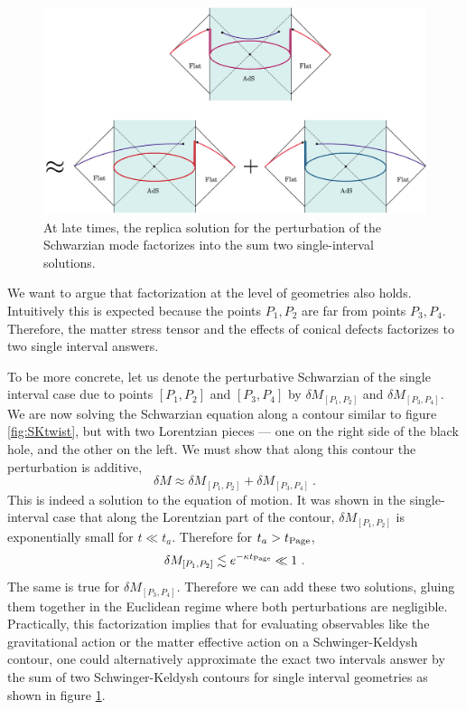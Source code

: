 \documentclass[11pt,oneside,letterpaper]{article}
\newcommand{\be}{\begin{equation}}
\newcommand{\ee}{\end{equation}}
\def\be{\begin{eqnarray}}
\def\ee{\end{eqnarray}}
\def\be{\begin{equation}}
\def\ee{\end{equation}}
\numberwithin{equation}{section}
\def\be{\begin{equation}}
\def\ee{\end{equation}}
\def \be {\begin{equation}}
\def \ee {\end{equation}}
\begin{document}
\begin{spacing}{1.1}
\begin{figure}[h!]
\centering
\includegraphics[scale=0.17]{./figures/picture_two_interval2.jpg}
\caption{At late times, the replica solution for the perturbation of the Schwarzian mode factorizes into the sum two single-interval solutions.} \label{cartoon_factorization}
\end{figure}

We want to argue that factorization at the level of geometries also holds.  Intuitively this is expected because the points $P_1, P_2$ are far from points $P_3, P_4$. Therefore, the matter stress tensor and the effects of conical defects factorizes to two single interval answers. 

To be more concrete, let us denote the perturbative Schwarzian of the single interval case due to points $[P_1, P_2]$ and $[P_3, P_4]$ by $\delta M_{[P_1, P_2]}$ and $\delta M_{[P_3, P_4]}$. We are now solving the Schwarzian equation along a contour similar to figure \ref{fig:SKtwist}, but with two Lorentzian pieces --- one on the right side of the black hole, and the other on the left. We must show that along this contour the perturbation is additive,
\be
\delta M \approx \delta M_{[P_1, P_2]} + \delta M_{[P_3, P_4]}  \ .
\ee
This is indeed a solution to the equation of motion. It was shown in the single-interval case that along the Lorentzian part of the contour, $\delta M_{[P_1, P_2]}$ is exponentially small for $ t \ll t_a$.  Therefore for $t_a > t_{\rm Page}$,
\be
\delta M_{[P_1, P_2]} \lesssim e^{-\kappa t_{\rm Page}} \ll 1 \ .
\ee
The same is true for $\delta M_{[P_3, P_4]} $.  Therefore we can add these two solutions, gluing them together in the Euclidean regime where both perturbations are negligible.
Practically, this factorization implies that for evaluating observables like the gravitational action or the matter effective action on a Schwinger-Keldysh contour, one could alternatively approximate the exact two intervals answer by the sum of two Schwinger-Keldysh contours for single interval geometries as shown in figure \ref{cartoon_factorization}. 


\end{spacing}
\end{document}
